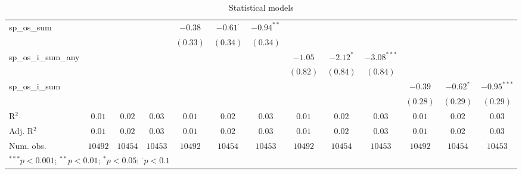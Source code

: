 \begin{sidewaystable}
\begin{center}
{\begin{tabular}{l c c c c c c c c c c c c}
sp\_os\_sum         &                &                &                & $-0.38$        & $-0.61^{\cdot}$ & $-0.94^{**}$     &                &                 &                &                &                &                \\
                    &                &                &                & $(0.33)$       & $(0.34)$        & $(0.34)$         &                &                 &                &                &                &                \\
sp\_os\_i\_sum\_any &                &                &                &                &                 &                  & $-1.05$        & $-2.12^{*}$     & $-3.08^{***}$  &                &                &                \\
                    &                &                &                &                &                 &                  & $(0.82)$       & $(0.84)$        & $(0.84)$       &                &                &                \\
sp\_os\_i\_sum      &                &                &                &                &                 &                  &                &                 &                & $-0.39$        & $-0.62^{*}$    & $-0.95^{***}$  \\
                    &                &                &                &                &                 &                  &                &                 &                & $(0.28)$       & $(0.29)$       & $(0.29)$       \\
\hline
R$^2$               & $0.01$         & $0.02$         & $0.03$         & $0.01$         & $0.02$          & $0.03$           & $0.01$         & $0.02$          & $0.03$         & $0.01$         & $0.02$         & $0.03$         \\
Adj. R$^2$          & $0.01$         & $0.02$         & $0.03$         & $0.01$         & $0.02$          & $0.03$           & $0.01$         & $0.02$          & $0.03$         & $0.01$         & $0.02$         & $0.03$         \\
Num. obs.           & $10492$        & $10454$        & $10453$        & $10492$        & $10454$         & $10453$          & $10492$        & $10454$         & $10453$        & $10492$        & $10454$        & $10453$        \\
\hline
\multicolumn{13}{l}{\scriptsize{$^{***}p<0.001$; $^{**}p<0.01$; $^{*}p<0.05$; $^{\cdot}p<0.1$}}
\end{tabular}
}
\caption{Statistical models}
\label{table:coefficients}
\end{center}
\end{sidewaystable}
